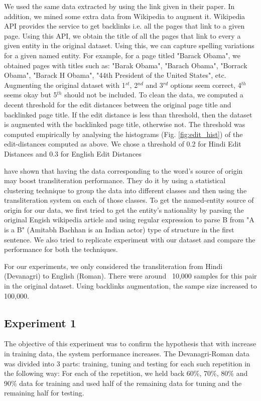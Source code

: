 \documentclass[11pt,a4paper]{article}
\begin{document}
We used the same data extracted by \citet{burch-1} using the link given in their paper. In addition, we mined some extra data from Wikipedia to augment it. Wikipedia API provides the service to get backlinks i.e. all the pages that link to a given page. Using this API, we obtain the title of all the pages that link to every a given entity in the original dataset. Using this, we can capture spelling variations for a given named entity. For example, for a page titled "Barack Obama", we obtained pages with titles such as: "Barak Obama", "Barach Obama", "Borrack Obama", "Barack H Obama", "44th President of the United States", etc. Augmenting the original dataset with 1$^{st}$, 2$^{nd}$ and 3$^{rd}$ options seem correct, 4$^{th}$ seems okay but 5$^{th}$ should not be included. To clean the data, we computed a decent threshold for the edit distances between the original page title and backlinked page title. If the edit distance is less than threshold, then the dataset is augmented with the backlinked page title, otherwise not. The threshold was computed empirically by analysing the histograms (Fig. \ref{fig:edit_hist}) of the edit-distances computed as above. We chose a threshold of 0.2 for Hindi Edit Distances and 0.3 for English Edit Distances

\par
\citet{huang-name-origin-1} have shown that having the data corresponding to the word's source of origin may boost transliteration performance. They do it by using a statistical clustering technique to group the data into different classes and then using the transliteration system on each of those classes. To get the named-entity source of origin for our data, we first tried to get the entity's nationality by parsing the original Engish wikipedia article and using regular expression to parse B from "A is a B" (Amitabh Bachhan is an Indian actor) type of structure in the first sentence. We also tried to replicate \citet{huang-name-origin-1} experiment with our dataset and compare the performance for both the techniques. 
\par
For our experiments, we only considered the transliteration from Hindi (Devanagri) to English (Roman). There were around ~10,000 samples for this pair in the original dataset. Using backlinks augmentation, the sampe size increased to 100,000.

\subsection{Experiment 1}
The objective of this experiment was to confirm the hypothesis that with increase in training data, the system performance increases. The Devanagri-Roman data was divided into 3 parts: training, tuning and testing for each such repetition in the following way: For each of the repetition, we held back 60\%, 70\%, 80\% and 90\% data for training and used half of the remaining data for tuning and the remaining half for testing. 
\end{document}
